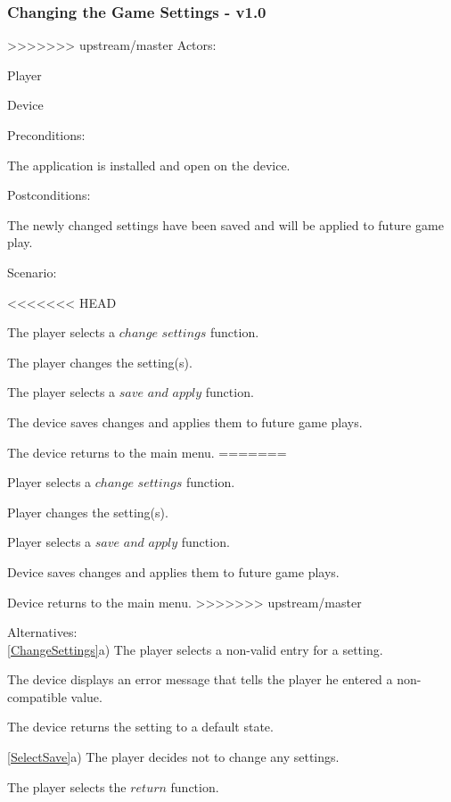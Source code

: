 \documentclass[12pt]{article}
\newenvironment{itemize*}%
  {\begin{itemize}%
  	\setlength{\parsep}{0pt}
    \setlength{\itemsep}{0pt}%
    \setlength{\parskip}{0pt}}%
  {\end{itemize}}
\newenvironment{enumerate*}%
  {\begin{enumerate}%
  	\setlength{\parsep}{0pt}
    \setlength{\itemsep}{0pt}%
    \setlength{\parskip}{0pt}}%
  {\end{enumerate}}
\begin{document}
\begin{itemize*}
\begin{itemize*}
\begin{enumerate*}
\subsubsection*{Changing the Game Settings - v1.0}
>>>>>>> upstream/master
Actors:
\begin{itemize*}
\item Player
\item Device
\end{itemize*}
Preconditions:
\begin{itemize*}
\item The application is installed and open on the device.
\end{itemize*}
Postconditions:
\begin{itemize*}
\item The newly changed settings have been saved and will be applied to future game play.
\end{itemize*}
Scenario:
\begin{enumerate*}
<<<<<<< HEAD
\item \label{SelectChangeSettings}The player selects a $change$ $settings$ function.
\item \label{ChangeSettings}The player changes the setting(s).
\item \label{SelectSave}The player selects a $save$ $and$ $apply$ function.
\item \label{SystemSaves}The device saves changes and applies them to future game plays.
\item \label{ReturnToMainMenu}The device returns to the main menu.
=======
\item \label{SelectChangeSettings}Player selects a $change$ $settings$ function.
\item \label{ChangeSettings}Player changes the setting(s).
\item \label{SelectSave}Player selects a $save$ $and$ $apply$ function.
\item \label{SystemSaves}Device saves changes and applies them to future game plays.
\item \label{ReturnToMainMenu}Device returns to the main menu.
>>>>>>> upstream/master
\end{enumerate*}
Alternatives:\\
\ref{ChangeSettings}a) The player selects a non-valid entry for a setting.
\begin{enumerate*}
\item The device displays an error message that tells the player he entered a non-compatible value.
\item The device returns the setting to a default state.
\end{enumerate*}
\ref{SelectSave}a) The player decides not to change any settings.
\begin{enumerate*}
\item The player selects the $return$ function.
\end{enumerate*}
\onehalfspacing


\end{enumerate*}
\end{itemize*}
\end{itemize*}
\end{document}
